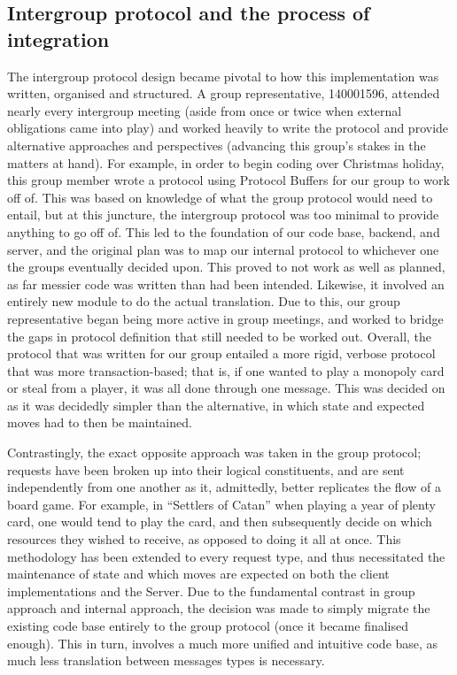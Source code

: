 \documentclass[a4paper,doc,draftfirst]{apa6}
\begin{document}
\subsection{Intergroup protocol and the process of integration}
The intergroup protocol design became pivotal to how this implementation was written, organised and structured. A group representative, 140001596, attended nearly every intergroup meeting (aside from once or twice when external obligations came into play) and worked heavily to write the protocol and provide alternative approaches and perspectives (advancing this group’s stakes in the matters at hand). For example, in order to begin coding over Christmas holiday, this group member wrote a protocol using Protocol Buffers for our group to work off of. This was based on knowledge of what the group protocol would need to entail, but at this juncture, the intergroup protocol was too minimal to provide anything to go off of. This led to the foundation of our code base, backend, and server, and the original plan was to map our internal protocol to whichever one the groups eventually decided upon. This proved to not work as well as planned, as far messier code was written than had been intended. Likewise, it involved an entirely new module to do the actual translation. Due to this, our group representative began being more active in group meetings, and worked to bridge the gaps in protocol definition that still needed to be worked out. Overall, the protocol that was written for our group entailed a more rigid, verbose protocol that was more transaction-based; that is, if one wanted to play a monopoly card or steal from a player, it was all done through one message. This was decided on as it was decidedly simpler than the alternative, in which state and expected moves had to then be maintained.

Contrastingly, the exact opposite approach was taken in the group protocol; requests have been broken up into their logical constituents, and are sent independently from one another as it, admittedly, better replicates the flow of a board game. For example, in “Settlers of Catan” when playing a year of plenty card, one would tend to play the card, and then subsequently decide on which resources they wished to receive, as opposed to doing it all at once. This methodology has been extended to every request type, and thus necessitated the maintenance of state and which moves are expected on both the client implementations and the Server. Due to the fundamental contrast in group approach and internal approach, the decision was made to simply migrate the existing code base entirely to the group protocol (once it became finalised enough). This in turn, involves a much more unified and intuitive code base, as much less translation between messages types is necessary.
\end{document}
